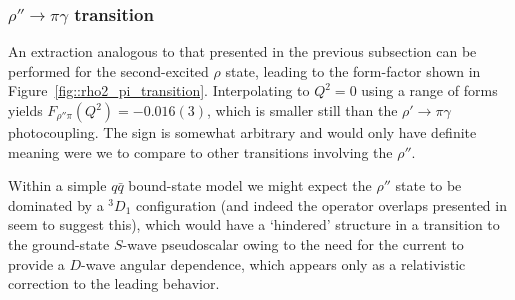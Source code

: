 \subsubsection{$\rho''\rightarrow \pi \gamma$ transition}

An extraction analogous to that presented in the previous subsection can be performed for the second-excited $\rho$ state, leading to the form-factor shown in Figure~\ref{fig::rho2_pi_transition}. Interpolating to $Q^2=0$ using a range of forms yields $F_{\rho'' \pi}(Q^2) = -0.016(3)$, which is smaller still than the $\rho' \to \pi \gamma$ photocoupling. The sign is somewhat arbitrary and would only have definite meaning were we to compare to other transitions involving the $\rho''$.

Within a simple $q\bar{q}$ bound-state model we might expect the $\rho''$ state to be dominated by a $^3\!D_1$ configuration (and indeed the operator overlaps presented in \cite{Dudek:2011bn} seem to suggest this), which would have a `hindered' structure in a transition to the ground-state $S$-wave pseudoscalar owing to the need for the current to provide a $D$-wave angular dependence, which appears only as a relativistic correction to the leading behavior. 





